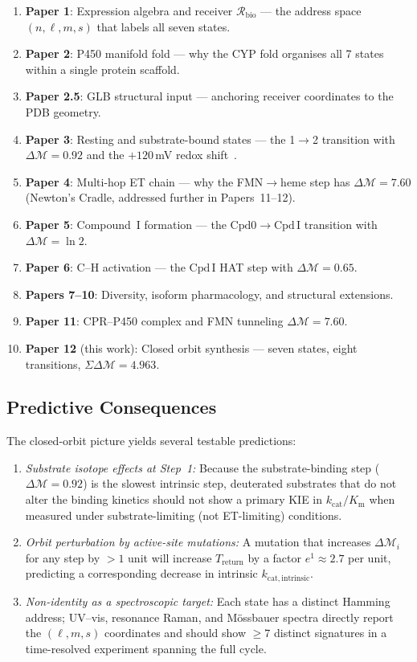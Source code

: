 \documentclass[11pt,twocolumn,a4paper]{article}
\theoremstyle{definition}
\theoremstyle{remark}
\newcommand{\Recv}{\mathcal{R}}
\newcommand{\depth}{\mathcal{M}}
\newcommand{\CmpdI}{\mathrm{Cpd\,I}}
\begin{document}
\begin{enumerate}
  \item \textbf{Paper 1}: Expression algebra and receiver $\Recv_\mathrm{bio}$ — the
    address space $(n, \ell, m, s)$ that labels all seven states.
  \item \textbf{Paper 2}: P450 manifold fold — why the CYP fold organises
    all 7 states within a single protein scaffold.
  \item \textbf{Paper 2.5}: GLB structural input — anchoring receiver
    coordinates to the PDB geometry.
  \item \textbf{Paper 3}: Resting and substrate-bound states — the 1$\to$2
    transition with $\Delta\depth = 0.92$ and the $+120$\,mV redox shift~\citep{sligar1979}.
  \item \textbf{Paper 4}: Multi-hop ET chain — why the FMN$\to$heme step has
    $\Delta\depth = 7.60$ (Newton's Cradle, addressed further in Papers~11--12).
  \item \textbf{Paper 5}: Compound~I formation — the $\mathrm{Cpd0}\to\CmpdI$
    transition with $\Delta\depth = \ln 2$.
  \item \textbf{Paper 6}: C--H activation — the $\CmpdI$ HAT step with
    $\Delta\depth = 0.65$.
  \item \textbf{Papers 7--10}: Diversity, isoform pharmacology, and structural
    extensions.
  \item \textbf{Paper 11}: CPR--P450 complex and FMN tunneling $\Delta\depth = 7.60$.
  \item \textbf{Paper 12} (this work): Closed orbit synthesis — seven states,
    eight transitions, $\Sigma\Delta\depth = 4.963$.
\end{enumerate}

\subsection{Predictive Consequences}

The closed-orbit picture yields several testable predictions:
\begin{enumerate}[label=(\roman*)]
  \item \emph{Substrate isotope effects at Step~1:} Because the substrate-binding
    step ($\Delta\depth = 0.92$) is the slowest intrinsic step, deuterated
    substrates that do not alter the binding kinetics should not show a primary
    KIE in $k_\mathrm{cat}/K_\mathrm{m}$ when measured under substrate-limiting
    (not ET-limiting) conditions.
  \item \emph{Orbit perturbation by active-site mutations:} A mutation that
    increases $\Delta\depth_{i}$ for any step by $>1$ unit will increase
    $T_\mathrm{return}$ by a factor $e^1 \approx 2.7$ per unit, predicting
    a corresponding decrease in intrinsic $k_\mathrm{cat,intrinsic}$.
  \item \emph{Non-identity as a spectroscopic target:} Each state has a
    distinct Hamming address; UV--vis, resonance Raman, and M\"{o}ssbauer spectra
    directly report the $(\ell, m, s)$ coordinates and should show $\geq 7$
    distinct signatures in a time-resolved experiment spanning the full cycle.
\end{enumerate}
\end{document}
